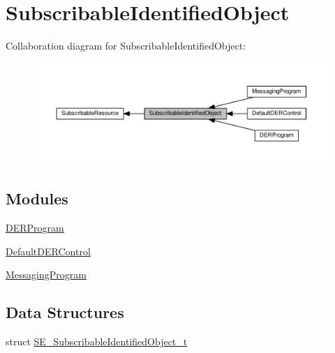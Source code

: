 \hypertarget{group__SubscribableIdentifiedObject}{}\section{Subscribable\+Identified\+Object}
\label{group__SubscribableIdentifiedObject}
Collaboration diagram for Subscribable\+Identified\+Object\+:\nopagebreak
\begin{figure}[H]
\begin{center}
\leavevmode
\includegraphics[width=350pt]{group__SubscribableIdentifiedObject}
\end{center}
\end{figure}
\subsection*{Modules}
\begin{DoxyCompactItemize}
\item 
\hyperlink{group__DERProgram}{D\+E\+R\+Program}
\item 
\hyperlink{group__DefaultDERControl}{Default\+D\+E\+R\+Control}
\item 
\hyperlink{group__MessagingProgram}{Messaging\+Program}
\end{DoxyCompactItemize}
\subsection*{Data Structures}
\begin{DoxyCompactItemize}
\item 
struct \hyperlink{structSE__SubscribableIdentifiedObject__t}{S\+E\+\_\+\+Subscribable\+Identified\+Object\+\_\+t}
\end{DoxyCompactItemize}
